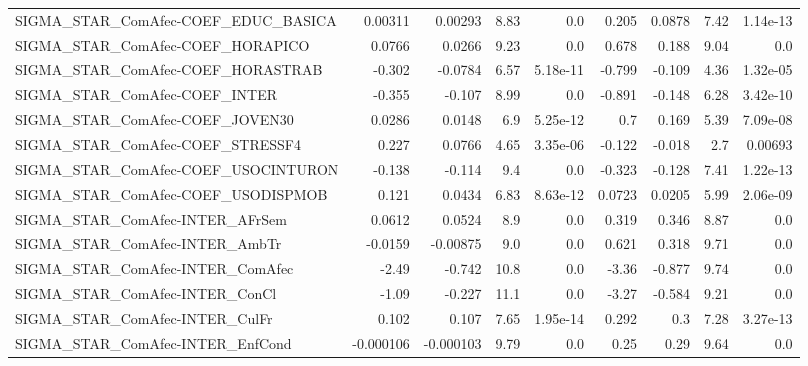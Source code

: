 \begin{tabular}{lrrrrrrrr}
SIGMA\_STAR\_ComAfec-COEF\_EDUC\_BASICA   &     0.00311 &      0.00293 &     8.83 &      0.0 &      0.205 &      0.0878 &         7.42 &      1.14e-13 \\
SIGMA\_STAR\_ComAfec-COEF\_HORAPICO      &      0.0766 &       0.0266 &     9.23 &      0.0 &      0.678 &       0.188 &         9.04 &           0.0 \\
SIGMA\_STAR\_ComAfec-COEF\_HORASTRAB     &      -0.302 &      -0.0784 &     6.57 & 5.18e-11 &     -0.799 &      -0.109 &         4.36 &      1.32e-05 \\
SIGMA\_STAR\_ComAfec-COEF\_INTER         &      -0.355 &       -0.107 &     8.99 &      0.0 &     -0.891 &      -0.148 &         6.28 &      3.42e-10 \\
SIGMA\_STAR\_ComAfec-COEF\_JOVEN30       &      0.0286 &       0.0148 &      6.9 & 5.25e-12 &        0.7 &       0.169 &         5.39 &      7.09e-08 \\
SIGMA\_STAR\_ComAfec-COEF\_STRESSF4      &       0.227 &       0.0766 &     4.65 & 3.35e-06 &     -0.122 &      -0.018 &          2.7 &       0.00693 \\
SIGMA\_STAR\_ComAfec-COEF\_USOCINTURON   &      -0.138 &       -0.114 &      9.4 &      0.0 &     -0.323 &      -0.128 &         7.41 &      1.22e-13 \\
SIGMA\_STAR\_ComAfec-COEF\_USODISPMOB    &       0.121 &       0.0434 &     6.83 & 8.63e-12 &     0.0723 &      0.0205 &         5.99 &      2.06e-09 \\
SIGMA\_STAR\_ComAfec-INTER\_AFrSem       &      0.0612 &       0.0524 &      8.9 &      0.0 &      0.319 &       0.346 &         8.87 &           0.0 \\
SIGMA\_STAR\_ComAfec-INTER\_AmbTr        &     -0.0159 &     -0.00875 &      9.0 &      0.0 &      0.621 &       0.318 &         9.71 &           0.0 \\
SIGMA\_STAR\_ComAfec-INTER\_ComAfec      &       -2.49 &       -0.742 &     10.8 &      0.0 &      -3.36 &      -0.877 &         9.74 &           0.0 \\
SIGMA\_STAR\_ComAfec-INTER\_ConCl        &       -1.09 &       -0.227 &     11.1 &      0.0 &      -3.27 &      -0.584 &         9.21 &           0.0 \\
SIGMA\_STAR\_ComAfec-INTER\_CulFr        &       0.102 &        0.107 &     7.65 & 1.95e-14 &      0.292 &         0.3 &         7.28 &      3.27e-13 \\
SIGMA\_STAR\_ComAfec-INTER\_EnfCond      &   -0.000106 &    -0.000103 &     9.79 &      0.0 &       0.25 &        0.29 &         9.64 &           0.0 \\

\end{tabular}

